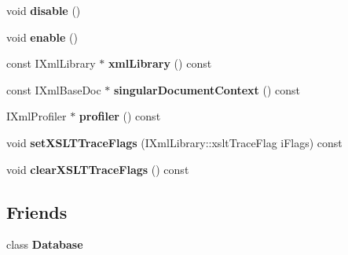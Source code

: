 \begin{DoxyCompactItemize}
\item 
\hypertarget{classgeneral__server_1_1DatabaseAdminQueryEnvironment_ade7797dc948b26a35477fd22a7e5cad4}{void {\bfseries disable} ()}\label{classgeneral__server_1_1DatabaseAdminQueryEnvironment_ade7797dc948b26a35477fd22a7e5cad4}

\item 
\hypertarget{classgeneral__server_1_1DatabaseAdminQueryEnvironment_a4a5372af47e312a1f3487f5e21c348f3}{void {\bfseries enable} ()}\label{classgeneral__server_1_1DatabaseAdminQueryEnvironment_a4a5372af47e312a1f3487f5e21c348f3}

\item 
\hypertarget{classgeneral__server_1_1DatabaseAdminQueryEnvironment_a6707700bbdee09f1b004f6d6d8715f2b}{const \-I\-Xml\-Library $\ast$ {\bfseries xml\-Library} () const }\label{classgeneral__server_1_1DatabaseAdminQueryEnvironment_a6707700bbdee09f1b004f6d6d8715f2b}

\item 
\hypertarget{classgeneral__server_1_1DatabaseAdminQueryEnvironment_a1e3bb280cf43e1b8222b7dfe8faac4c5}{const \-I\-Xml\-Base\-Doc $\ast$ {\bfseries singular\-Document\-Context} () const }\label{classgeneral__server_1_1DatabaseAdminQueryEnvironment_a1e3bb280cf43e1b8222b7dfe8faac4c5}

\item 
\hypertarget{classgeneral__server_1_1DatabaseAdminQueryEnvironment_a69ffc975047670a84c7fff74e435544f}{\-I\-Xml\-Profiler $\ast$ {\bfseries profiler} () const }\label{classgeneral__server_1_1DatabaseAdminQueryEnvironment_a69ffc975047670a84c7fff74e435544f}

\item 
\hypertarget{classgeneral__server_1_1DatabaseAdminQueryEnvironment_a62789472c9cf08e574b8b006acf83524}{void {\bfseries set\-X\-S\-L\-T\-Trace\-Flags} (\-I\-Xml\-Library\-::xslt\-Trace\-Flag i\-Flags) const }\label{classgeneral__server_1_1DatabaseAdminQueryEnvironment_a62789472c9cf08e574b8b006acf83524}

\item 
\hypertarget{classgeneral__server_1_1DatabaseAdminQueryEnvironment_ac3063e8fe4742219ab4ed9db96e70962}{void {\bfseries clear\-X\-S\-L\-T\-Trace\-Flags} () const }\label{classgeneral__server_1_1DatabaseAdminQueryEnvironment_ac3063e8fe4742219ab4ed9db96e70962}

\end{DoxyCompactItemize}
\subsection*{\-Friends}
\begin{DoxyCompactItemize}
\item 
\hypertarget{classgeneral__server_1_1DatabaseAdminQueryEnvironment_a6efef52d7a939622bbc934ff6b90ffe0}{class {\bfseries \-Database}}\label{classgeneral__server_1_1DatabaseAdminQueryEnvironment_a6efef52d7a939622bbc934ff6b90ffe0}

\end{DoxyCompactItemize}


